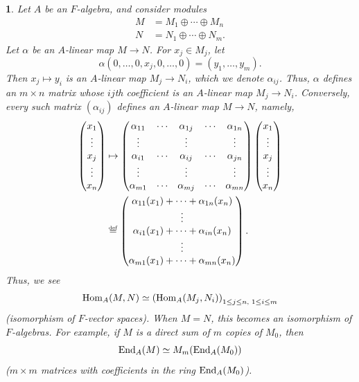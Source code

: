 \documentclass[a4paper,11pt,final]{memoir}%
\newtheorem{plain}[X]{}
\theoremstyle{nonumberplain}
\begin{document}
\begin{plain}
\label{r25}Let $A$ be an $F$-algebra, and consider modules%
\begin{align*}
M  &  =M_{1}\oplus\cdots\oplus M_{n}\\
N  &  =N_{1}\oplus\cdots\oplus N_{m}.
\end{align*}
Let $\alpha$ be an $A$-linear map $M\rightarrow N$. For $x_{j}\in M_{j}$, let%
\[
\alpha(0,\ldots,0,x_{j},0,\ldots,0)=(y_{1},\ldots,y_{m}).
\]
Then $x_{j}\mapsto y_{i}$ is an $A$-linear map $M_{j}\rightarrow N_{i}$, which
we denote $\alpha_{ij}$. Thus, $\alpha$ defines an $m\times n$ matrix whose
$ij$th coefficient is an $A$-linear map $M_{j}\rightarrow N_{i}$. Conversely,
every such matrix $(\alpha_{ij})$ defines an $A$-linear map $M\rightarrow N$,
namely,%
\begin{align*}%
\begin{pmatrix}
x_{1}\\
\vdots\\
x_{j}\\
\vdots\\
x_{n}%
\end{pmatrix}
&\mapsto%
\begin{pmatrix}
\alpha_{11} & \cdots & \alpha_{1j} & \cdots & \alpha_{1n}\\
\vdots &  & \vdots &  & \vdots\\
\alpha_{i1} & \cdots & \alpha_{ij} & \cdots & \alpha_{jn}\\
\vdots &  & \vdots &  & \vdots\\
\alpha_{m1} & \cdots & \alpha_{mj} & \cdots & \alpha_{mn}%
\end{pmatrix}%
\begin{pmatrix}
x_{1}\\
\vdots\\
x_{j}\\
\vdots\\
x_{n}%
\end{pmatrix}\\
&\overset{\df}{=}%
\begin{pmatrix}
\alpha_{11}(x_{1})+\cdots+\alpha_{1n}(x_{n})\\
\vdots\\
\alpha_{i1}(x_{1})+\cdots+\alpha_{in}(x_{n})\\
\vdots\\
\alpha_{m1}(x_{1})+\cdots+\alpha_{mn}(x_{n})
\end{pmatrix}
.
\end{align*}
Thus, we see%
\begin{equation}
\Hom_{A}(M,N)\simeq\left(  \Hom_{A}(M_{j},N_{i})\right)  _{1\leq j\leq
n\text{, }1\leq i\leq m} \label{e22}%
\end{equation}
(isomorphism of $F$-vector spaces). When $M=N$, this becomes an isomorphism of
$F$-algebras. For example, if $M$ is a direct sum of $m$ copies of $M_{0}$,
then%
\begin{equation}
\End_{A}(M)\simeq M_{m}(\End_{A}(M_{0})) \label{e23}%
\end{equation}
($m\times m$ matrices with coefficients in the ring $\operatorname{End}_{A}(M_{0})$).
\end{plain}
\end{document}
